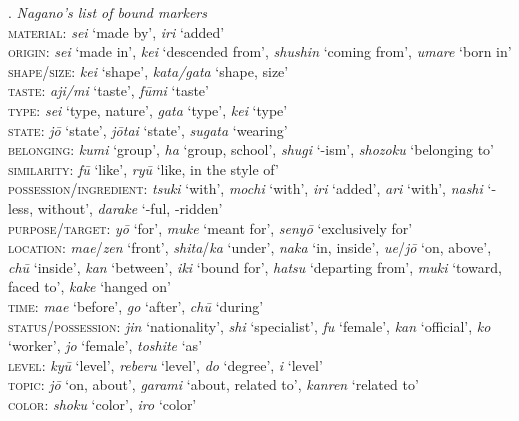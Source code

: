 \documentclass [output=book,colorlinks,citecolor=brown]{langscibook}
\begin{document}
\ex. \emph{Nagano's list of bound markers}\\
\textsc{material}: \textit{sei} ‘made by’, \textit{iri} ‘added’\\
\textsc{origin}: \textit{sei} ‘made in’, \textit{kei} ‘descended from’, \textit{shushin} ‘coming from’, \textit{umare} ‘born in’\\
\textsc{shape}/\textsc{size}: \textit{kei} ‘shape’, \textit{kata/gata} ‘shape, size’\\
\textsc{taste}: \textit{aji/mi} ‘taste’, \textit{fūmi} ‘taste’\\
\textsc{type}: \textit{sei} ‘type, nature’, \textit{gata} ‘type’, \textit{kei} ‘type’\\
\textsc{state}: \textit{jō} ‘state’, \textit{jōtai} ‘state’, \textit{sugata} ‘wearing’\\
\textsc{belonging}: \textit{kumi} ‘group’, \textit{ha} ‘group, school’, \textit{shugi} ‘-ism’, \textit{shozoku} ‘belonging to’\\
\textsc{similarity}: \textit{fū} ‘like’, \textit{ryū} ‘like, in the style of’\\
\textsc{possession}/\textsc{ingredient}: \textit{tsuki} ‘with’, \textit{mochi} ‘with’, \textit{iri} ‘added’, \textit{ari} ‘with’, \textit{nashi} ‘-less, without’, \textit{darake} ‘-ful, -ridden’\\
\textsc{purpose}/\textsc{target}: \textit{yō} ‘for’, \textit{muke} ‘meant for’, \textit{senyō} ‘exclusively for’\\
\textsc{location}: \textit{mae}/\textit{zen} ‘front’, \textit{shita}/\textit{ka} ‘under’, \textit{naka} ‘in, inside’, \textit{ue}/\textit{jō} ‘on, above’, \textit{chū} ‘inside’, \textit{kan} ‘between’, \textit{iki} ‘bound for’, \textit{hatsu} ‘departing from’, \textit{muki} ‘toward, faced to’, \textit{kake} ‘hanged on’\\
\textsc{time}: \textit{mae} ‘before’, \textit{go} ‘after’, \textit{chū} ‘during’\\
\textsc{status}/\textsc{possession}: \textit{jin} ‘nationality’, \textit{shi} ‘specialist’, \textit{fu} ‘female’, \textit{kan} ‘official’, \textit{ko} ‘worker’, \textit{jo} ‘female’, \textit{toshite} ‘as’\\
\textsc{level}: \textit{kyū} ‘level’, \textit{reberu} ‘level’, \textit{do} ‘degree’, \textit{i} ‘level’\\
\textsc{topic}: \textit{jō} ‘on, about’, \textit{garami} ‘about, related to’, \textit{kanren} ‘related to’\\
\textsc{color}: \textit{shoku} ‘color’, \textit{iro} ‘color’
\end{document}
